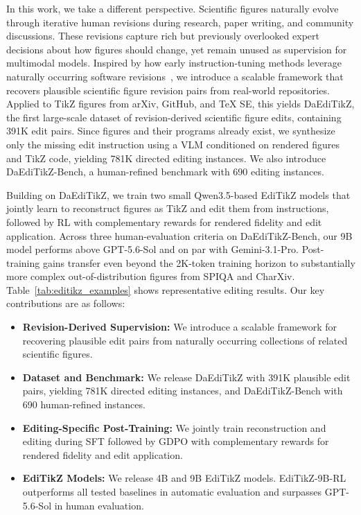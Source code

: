 In this work, we take a different perspective. Scientific figures naturally evolve through iterative human revisions during research, paper writing, and community discussions. These revisions capture rich but previously overlooked expert decisions about how figures should change, yet remain unused as supervision for multimodal models. Inspired by how early instruction-tuning methods leverage naturally occurring software revisions~\citep{muennighoff2024octopack, wei2024coeditor, li-etal-2024-instructcoder}, we introduce a scalable framework that recovers plausible scientific figure revision pairs from real-world repositories. Applied to TikZ figures from arXiv, GitHub, and TeX SE, this yields DaEdiTikZ, the first large-scale dataset of revision-derived scientific figure edits, containing 391K edit pairs. Since figures and their programs already exist, we synthesize only the missing edit instruction using a VLM conditioned on rendered figures and TikZ code, yielding 781K directed editing instances. We also introduce DaEdiTikZ-Bench, a human-refined benchmark with 690 editing instances.

Building on DaEdiTikZ, we train two small Qwen3.5-based EdiTikZ models that jointly learn to reconstruct figures as TikZ and edit them from instructions, followed by RL with complementary rewards for rendered fidelity and edit application. Across three human-evaluation criteria on DaEdiTikZ-Bench, our 9B model performs above GPT-5.6-Sol and on par with Gemini-3.1-Pro. Post-training gains transfer even beyond the 2K-token training horizon to substantially more complex out-of-distribution figures from SPIQA and CharXiv. Table~\ref{tab:editikz_examples} shows representative editing results. Our key contributions are as follows:



\begin{itemize}
\item \textbf{Revision-Derived Supervision:}
We introduce a scalable framework for recovering plausible edit pairs from naturally occurring collections of related scientific figures.
\item \textbf{Dataset and Benchmark:}
We release DaEdiTikZ with 391K plausible edit pairs, yielding 781K directed editing instances, and DaEdiTikZ-Bench with 690 human-refined instances.
\item \textbf{Editing-Specific Post-Training:}
We jointly train reconstruction and editing during SFT followed by GDPO with complementary rewards for rendered fidelity and edit application.
\item \textbf{EdiTikZ Models:}
We release 4B and 9B EdiTikZ models. EdiTikZ-9B-RL outperforms all tested baselines in automatic evaluation and surpasses GPT-5.6-Sol in human evaluation.
\end{itemize}